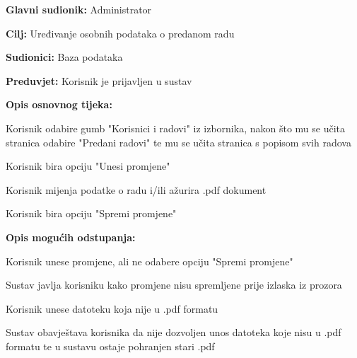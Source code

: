 					\noindent {}
					\begin{packed_item}
						\item \textbf{Glavni sudionik:} Administrator
						\item \textbf{Cilj:} Uređivanje osobnih podataka o predanom radu
						\item \textbf{Sudionici:} Baza podataka
						\item \textbf{Preduvjet:} Korisnik je prijavljen u sustav
						
						\item \textbf{Opis osnovnog tijeka:} 
						\item[] \begin{packed_enum}
							\item Korisnik odabire gumb "Korisnici i radovi" iz izbornika, nakon što mu se učita stranica odabire "Predani radovi" te mu se učita stranica s popisom svih radova
							\item Korisnik bira opciju "Unesi promjene"
							\item Korisnik mijenja podatke o radu i/ili ažurira .pdf dokument
							\item Korisnik bira opciju "Spremi promjene"
						\end{packed_enum}
					
						\item \textbf{Opis mogućih odstupanja:}
						\item[] \begin{packed_enum}

							\item[3.a] Korisnik unese promjene, ali ne odabere opciju "Spremi promjene"
							\item[] \begin{packed_enum}
								\item[1.] Sustav javlja korisniku kako promjene nisu spremljene prije izlaska iz prozora
							\end{packed_enum}
							\item[3.b] Korisnik unese datoteku koja nije u .pdf formatu
							\item[] \begin{packed_enum}
								\item[1.] Sustav obavještava korisnika da nije dozvoljen unos datoteka koje nisu u .pdf formatu te u sustavu ostaje pohranjen stari .pdf
							\end{packed_enum}
						\end{packed_enum}
					\end{packed_item}

